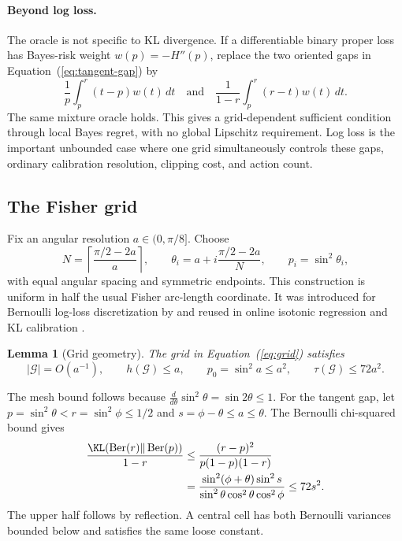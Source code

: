 \documentclass{article}
\newtheorem{lemma}{Lemma}
\newcommand{\Ber}{\operatorname{Ber}}
\begin{document}
\paragraph{Beyond log loss.}
The oracle is not specific to KL divergence. If a differentiable binary proper loss has Bayes-risk weight $w(p)=-H''(p)$, replace the two oriented gaps in Equation~(\ref{eq:tangent-gap}) by
\begin{equation}
 \frac1p\int_p^r(t-p)w(t)\,dt
 \quad\text{and}\quad
 \frac1{1-r}\int_p^r(r-t)w(t)\,dt.
 \label{eq:general-gaps-main}
\end{equation}
The same mixture oracle holds. This gives a grid-dependent sufficient condition through local Bayes regret, with no global Lipschitz requirement. Log loss is the important unbounded case where one grid simultaneously controls these gaps, ordinary calibration resolution, clipping cost, and action count.

\subsection{The Fisher grid}

Fix an angular resolution $a\in(0,\pi/8]$. Choose
\begin{equation}
 N=\left\lceil\frac{\pi/2-2a}{a}\right\rceil,\qquad
 \theta_i=a+i\frac{\pi/2-2a}{N},\qquad
 p_i=\sin^2\theta_i,
 \label{eq:grid}
\end{equation}
with equal angular spacing and symmetric endpoints. This construction is uniform in half the usual Fisher arc-length coordinate. It was introduced for Bernoulli log-loss discretization by \citet{derooij2009switching} and reused in online isotonic regression and KL calibration \citep{kotlowski2016isotonic,luo2025kl,liu2026adaptive}.

\begin{lemma}[Grid geometry]
\label{lem:grid}
The grid in Equation~(\ref{eq:grid}) satisfies
\begin{equation}
 |\mathcal G|=O(a^{-1}),\qquad
 h(\mathcal G)\leq a,\qquad
 p_0=\sin^2a\leq a^2,\qquad
 \tau(\mathcal G)\leq72a^2.
 \label{eq:grid-bounds}
\end{equation}
\end{lemma}

The mesh bound follows because $\frac{d}{d\theta}\sin^2\theta=\sin2\theta\leq1$. For the tangent gap, let $p=\sin^2\theta<r=\sin^2\phi\leq1/2$ and $s=\phi-\theta\leq a\leq\theta$. The Bernoulli chi-squared bound gives
\begin{align}
 \frac{\KL(\Ber(r)\Vert\Ber(p))}{1-r}
 &\leq\frac{(r-p)^2}{p(1-p)(1-r)} \nonumber\\
 &=\frac{\sin^2(\phi+\theta)\sin^2s}
 {\sin^2\theta\cos^2\theta\cos^2\phi}
 \leq72s^2.
 \label{eq:grid-proof}
\end{align}
The upper half follows by reflection. A central cell has both Bernoulli variances bounded below and satisfies the same loose constant.
\end{document}
